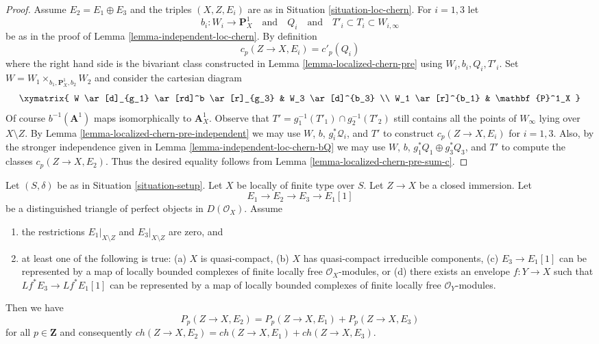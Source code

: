 \begin{proof}
\medskip\noindent
Assume $E_2 = E_1 \oplus E_3$ and the triples $(X, Z, E_i)$
are as in Situation \ref{situation-loc-chern}.
For $i = 1, 3$ let
$$
b_i : W_i \to \mathbf{P}^1_X
\quad\text{and}\quad
Q_i
\quad\text{and}\quad
T'_i \subset T_i \subset W_{i, \infty}
$$
be as in the proof of Lemma \ref{lemma-independent-loc-chern}.
By definition
$$
c_p(Z \to X, E_i) = c'_p(Q_i)
$$
where the right hand side is the bivariant class constructed in
Lemma \ref{lemma-localized-chern-pre} using $W_i, b_i, Q_i, T'_i$.
Set $W = W_1 \times_{b_1, \mathbf{P}^1_X, b_2} W_2$ and consider
the cartesian diagram
$$
\xymatrix{
W \ar[d]_{g_1} \ar[rd]^b \ar[r]_{g_3} & W_3 \ar[d]^{b_3} \\
W_1 \ar[r]^{b_1} & \mathbf{P}^1_X
}
$$
Of course $b^{-1}(\mathbf{A}^1)$ maps isomorphically to $\mathbf{A}^1_X$.
Observe that $T' = g_1^{-1}(T'_1) \cap g_2^{-1}(T'_2)$ still contains
all the points of $W_\infty$ lying over $X \setminus Z$.
By Lemma \ref{lemma-localized-chern-pre-independent} we may use
$W$, $b$, $g_i^*\mathcal{Q}_i$, and
$T'$ to construct $c_p(Z \to X, E_i)$ for $i = 1, 3$.
Also, by the stronger independence given in
Lemma \ref{lemma-independent-loc-chern-bQ} we may use
$W$, $b$, $g_1^*Q_1 \oplus g_3^*Q_3$, and $T'$
to compute the classes $c_p(Z \to X, E_2)$.
Thus the desired equality follows from
Lemma \ref{lemma-localized-chern-pre-sum-c}.
\end{proof}

\begin{lemma}
\label{lemma-additivity-loc-chern-P}
Let $(S, \delta)$ be as in Situation \ref{situation-setup}.
Let $X$ be locally of finite type over $S$. Let $Z \to X$ be
a closed immersion. Let
$$
E_1 \to E_2 \to E_3 \to E_1[1]
$$
be a distinguished triangle of perfect objects in $D(\mathcal{O}_X)$.
Assume
\begin{enumerate}
\item the restrictions $E_1|_{X \setminus Z}$ and $E_3|_{X \setminus Z}$
are zero, and
\item at least one of the following is true:
(a) $X$ is quasi-compact,
(b) $X$ has quasi-compact irreducible components,
(c) $E_3 \to E_1[1]$ can be represented by a map of locally
bounded complexes of finite locally free $\mathcal{O}_X$-modules, or
(d) there exists an envelope $f : Y \to X$ such that $Lf^*E_3 \to Lf^*E_1[1]$
can be represented by a map of locally bounded complexes of
finite locally free $\mathcal{O}_Y$-modules.
\end{enumerate}
Then we have
$$
P_p(Z \to X, E_2) = P_p(Z \to X, E_1) + P_p(Z \to X, E_3)
$$
for all $p \in \mathbf{Z}$ and consequently
$ch(Z \to X, E_2) = ch(Z \to X, E_1) + ch(Z \to X, E_3)$.
\end{lemma}

